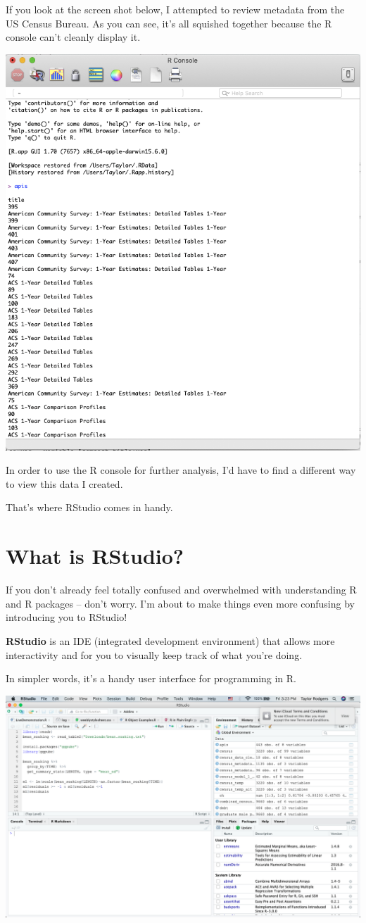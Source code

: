 \documentclass[
]{book}
\begin{document}
If you look at the screen shot below, I attempted to review metadata from the US Census Bureau. As you can see, it's all squished together because the R console can't cleanly display it.

\begin{center}\includegraphics[width=0.5\linewidth]{1.9_RConsole_Census} \end{center}

In order to use the R console for further analysis, I'd have to find a different way to view this data I created.

That's where RStudio comes in handy.

\hypertarget{what-is-rstudio}{%
\section{What is RStudio?}\label{what-is-rstudio}}

If you don't already feel totally confused and overwhelmed with understanding R and R packages -- don't worry. I'm about to make things even more confusing by introducing you to RStudio!

\textbf{RStudio} is an IDE (integrated development environment) that allows more interactivity and for you to visually keep track of what you're doing.

In simpler words, it's a handy user interface for programming in R.

\begin{center}\includegraphics[width=0.75\linewidth]{1.10_RStudio} \end{center}
\end{document}
